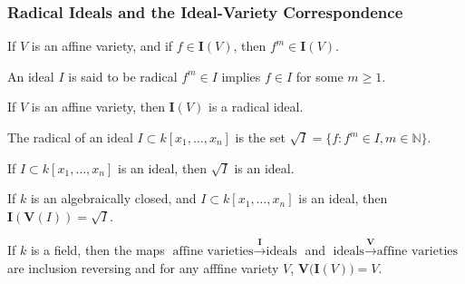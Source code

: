 \documentclass[crop=false,class=book,oneside]{standalone}
\begin{document}
            \subsubsection{Radical Ideals and the Ideal-Variety Correspondence}
                \begin{theorem}
                    If $V$ is an affine variety, and if
                    $f\in \textbf{I}(V)$, then $f^m\in \textbf{I}(V)$.
                \end{theorem}
                \begin{definition}
                    An ideal $I$ is said to be radical $f^m \in I$
                    implies $f\in I$ for some $m\geq 1$.
                \end{definition}
                \begin{theorem}
                    If $V$ is an affine variety,
                    then $\textbf{I}(V)$ is a radical ideal.
                \end{theorem}
                \begin{definition}
                    The radical of an ideal
                    $I\subset k[x_{1},\hdots,x_{n}]$ is the set
                    $\sqrt{I}=\{f:f^{m}\in I,m\in\mathbb{N}\}$.
                \end{definition}
                \begin{theorem}
                    If $I\subset k[x_1,\hdots ,x_n]$ is an ideal,
                    then $\sqrt{I}$ is an ideal.
                \end{theorem}
                \begin{theorem}
                    If $k$ is an algebraically closed,
                    and $I\subset k[x_1,\hdots ,x_n]$ is an ideal,
                    then $\textbf{I}(\mathbf{V}(I))=\sqrt{I}$.
                \end{theorem}
                \begin{theorem}
                    If $k$ is a field, then the maps
                    $\textrm{affine varieties}%
                     \overset{\textbf{I}}\rightarrow\textrm{ideals}$
                    and
                    $\textrm{ideals}%
                     \overset{\mathbf{V}}\rightarrow\textrm{affine varieties}$
                    are inclusion reversing and for any
                    afffine variety $V$,
                    $\mathbf{V}\big(\textbf{I}(V)\big)=V$.
                \end{theorem}
\end{document}
